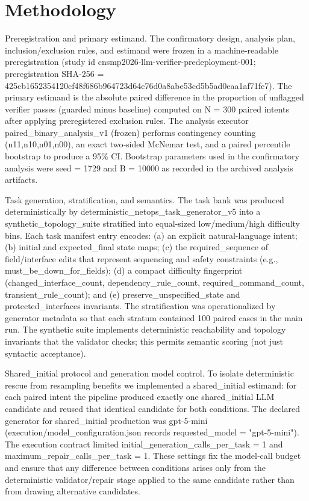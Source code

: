 \documentclass[conference]{IEEEtran}
\begin{document}
\section{Methodology}
Preregistration and primary estimand. The confirmatory design, analysis plan, inclusion/exclusion rules, and estimand were frozen in a machine‑readable preregistration (study id cnsmp2026-llm-verifier-predeployment-001; preregistration SHA‑256 = 425cb165\allowbreak{}2354120c\allowbreak{}f48f686b\allowbreak{}964723d6\allowbreak{}4c76d0a8\allowbreak{}abe53cd5\allowbreak{}b5ad0eaa\allowbreak{}1af71fc7). The primary estimand is the absolute paired difference in the proportion of unflagged verifier passes (guarded minus baseline) computed on N = 300 paired intents after applying preregistered exclusion rules. The analysis executor paired\_binary\_analysis\_v1 (frozen) performs contingency counting (n11,n10,n01,n00), an exact two‑sided McNemar test, and a paired percentile bootstrap to produce a 95\% CI. Bootstrap parameters used in the confirmatory analysis were seed = 1729 and B = 10000 as recorded in the archived analysis artifacts.

Task generation, stratification, and semantics. The task bank was produced deterministically by deterministic\_netops\_task\_generator\_v5 into a synthetic\_topology\_suite stratified into equal-sized low/medium/high difficulty bins. Each task manifest entry encodes: (a) an explicit natural-language intent; (b) initial and expected\_final state maps; (c) the required\_sequence of field/interface edits that represent sequencing and safety constraints (e.g., must\_be\_down\_for\_fields); (d) a compact difficulty fingerprint (changed\_interface\_count, dependency\_rule\_count, required\_command\_count, transient\_rule\_count); and (e) preserve\_unspecified\_state and protected\_interfaces invariants. The stratification was operationalized by generator metadata so that each stratum contained 100 paired cases in the main run. The synthetic suite implements deterministic reachability and topology invariants that the validator checks; this permits semantic scoring (not just syntactic acceptance).

Shared\_initial protocol and generation model control. To isolate deterministic rescue from resampling benefits we implemented a shared\_initial estimand: for each paired intent the pipeline produced exactly one shared\_initial LLM candidate and reused that identical candidate for both conditions. The declared generator for shared\_initial production was gpt-5-mini (execution/model\_configuration.json records requested\_model = "gpt-5-mini"). The execution contract limited initial\_generation\_calls\_per\_task = 1 and maximum\_repair\_calls\_per\_task = 1. These settings fix the model‑call budget and ensure that any difference between conditions arises only from the deterministic validator/repair stage applied to the same candidate rather than from drawing alternative candidates.
\end{document}
